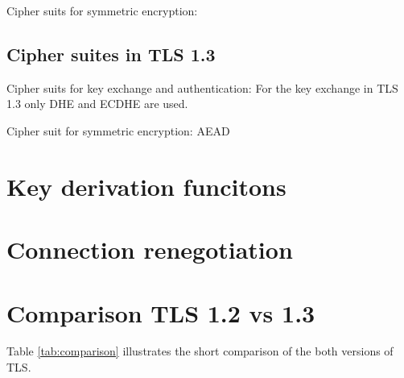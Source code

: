 Cipher suits for symmetric encryption:



\subsection{Cipher suites in TLS 1.3}
\label{subsec:ciphersuits1_3}

Cipher suits for key exchange and authentication:
For the key exchange in TLS 1.3 only DHE and ECDHE are used.

Cipher suit for symmetric encryption:
AEAD

\section{Key derivation funcitons}
\label{sec:comparison_kdf}

\section{Connection renegotiation}
\label{sec:comparison_renegotiation}

\section{Comparison TLS 1.2 vs 1.3}
\label{sec:comparison}

Table \ref{tab:comparison} illustrates the short comparison of the both versions of TLS.

